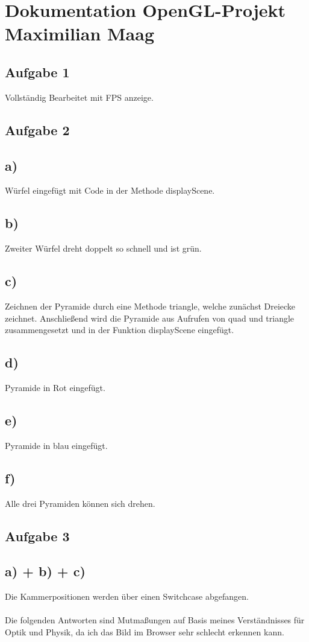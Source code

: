 \documentclass{article}
\begin{document}
	\section*{Dokumentation OpenGL-Projekt Maximilian Maag}
	\subsection*{Aufgabe 1}
	Vollständig Bearbeitet mit FPS anzeige.
	\subsection*{Aufgabe 2}
	\subsection*{a)}
	Würfel eingefügt mit Code in der Methode displayScene.
	\subsection*{b)}
	Zweiter Würfel dreht doppelt so schnell und ist grün.
	\subsection*{c)}
	Zeichnen der Pyramide durch eine Methode triangle, welche zunächst Dreiecke zeichnet. Anschließend wird die Pyramide aus Aufrufen von quad und triangle zusammengesetzt und in der Funktion displayScene eingefügt.
	\subsection*{d)}
	Pyramide in Rot eingefügt.
	\subsection*{e)}
	Pyramide in blau eingefügt.
	\subsection*{f)}
	Alle drei Pyramiden können sich drehen. 
	\subsection*{Aufgabe 3}
	\subsection*{a) + b) + c)}
	Die Kammerpositionen werden über einen Switchcase abgefangen.
	\\ \\
	Die folgenden Antworten sind Mutmaßungen auf Basis meines Verständnisses für Optik und Physik, da ich das Bild im Browser sehr schlecht erkennen kann.
\end{document}
